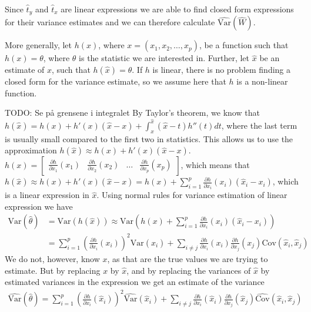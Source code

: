 \documentclass{article}
\begin{document}
\begin{example}
    Since \(\hat{t}_y\) and \(\hat{t}_x\) are linear expressions we are able to
    find closed form expressions for their variance estimates and we can
    therefore calculate \(\widehat{\mathrm{Var}} \left( \widehat{W} \right)\).

\end{example}

More generally, let \(h(x)\), where \(x = (x_1, x_2, \dots, x_p)\), be a function such that \(h(x) = \theta\), where
\(\theta\) is the statistic we are interested in. Further, let \(\hat{x}\) be an
estimate of \(x\), such that \(h(\hat{x}) = \hat{\theta}\). If \(h\) is
linear, there is no problem finding a closed form for the variance estimate,
so we assume here that \(h\) is a non-linear function.

TODO: Se på grensene i integralet
By Taylor's theorem, we know that \(h(\hat{x}) = h(x) + h'(x) (\hat{x} - x) + \int_x^{\hat{x}}  (\hat{x} -
t) h''(t) dt\), where the last term is usually small compared to the first two
in statistics. This allows us to use the approximation \(h(\hat{x}) \approx h(x) +
h'(x) (\hat{x} - x)\). \(h(x) = \begin{bmatrix} \frac{\partial h}{\partial x_1}
  (x_1) & \frac{\partial h}{\partial x_2} (x_2) & \dots & \frac{\partial
    h}{\partial x_p} (x_p)\end{bmatrix}\), which means that \(h(\hat{x}) \approx
h(x) + h'(x) (\hat{x} -
x) = h(x) + \sum_{i = 1}^p \frac{\partial h}{\partial x_i} (x_i) \left( \hat{x}_i - x_i
\right)\), which is a linear expression in \(\hat{x}\). Using normal rules for
variance estimation of linear expression we have
\begin{align*}
  \mathrm{Var} \left( \hat{\theta} \right)
  &= \mathrm{Var} \left( h(\hat{x}) \right)
  \approx \mathrm{Var} \left( h(x) + \sum_{i = 1}^p \frac{\partial h}{\partial x_i} (x_i) \left( \hat{x}_i - x_i
    \right) \right) \\
    &= \sum_{i = 1}^p \left( \frac{\partial h}{\partial x_i} (x_i)  \right)^2 \mathrm{Var} \left( \hat{x}_i \right) + \sum_{i \neq j}  \frac{\partial h}{\partial x_i} (x_i)  \frac{\partial h}{\partial x_j} (x_j)  \mathrm{Cov} \left( \hat{x}_i, \hat{x}_j \right)
\end{align*}
We do not, however, know \(x\), as that are the true values we are trying to
estimate. But by replacing \(x\) by \(\hat{x}\), and by replacing the variances
of \(\hat{x}\) by estimated variances in the expression we get an
estimate of the variance
\begin{align*}
  \widehat{\mathrm{Var}} \left( \hat{\theta} \right)
  = \sum_{i = 1}^p \left( \frac{\partial h}{\partial x_i} (\hat{x}_i)  \right)^2 \widehat{\mathrm{Var}} \left( \hat{x}_i \right) + \sum_{i \neq j}  \frac{\partial h}{\partial x_i} (\hat{x}_i)  \frac{\partial h}{\partial x_j} (\hat{x}_j)  \widehat{\mathrm{Cov}} \left( \hat{x}_i, \hat{x}_j \right)
\end{align*}
\end{document}
